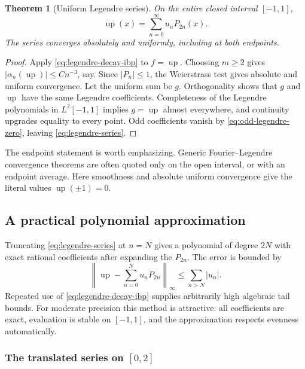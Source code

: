 \documentclass[11pt,oneside]{article}
\newtheorem{theorem}{Theorem}[section]
\theoremstyle{definition}
\theoremstyle{remark}
\newcommand{\Up}{\operatorname{up}}
\begin{document}
\begin{theorem}[Uniform Legendre series]
On the entire closed interval $[-1,1]$,
\begin{equation}
 \boxed{
 \Up(x)=\sum_{n=0}^{\infty}u_nP_{2n}(x).}                 \label{eq:legendre-series}
\end{equation}
The series converges absolutely and uniformly, including at both endpoints.
\end{theorem}

\begin{proof}
Apply \eqref{eq:legendre-decay-ibp} to $f=\Up$.  Choosing $m\ge2$ gives
$|\alpha_n(\Up)|\le Cn^{-3}$, say.  Since $|P_n|\le1$, the Weierstrass test gives absolute
and uniform convergence.  Let the uniform sum be $g$.  Orthogonality shows that $g$ and
$\Up$ have the same Legendre coefficients.  Completeness of the Legendre polynomials in
$L^2[-1,1]$ implies $g=\Up$ almost everywhere, and continuity upgrades equality to every
point.  Odd coefficients vanish by \eqref{eq:odd-legendre-zero}, leaving
\eqref{eq:legendre-series}.
\end{proof}

The endpoint statement is worth emphasizing.  Generic Fourier--Legendre convergence theorems
are often quoted only on the open interval, or with an endpoint average.  Here smoothness and
absolute uniform convergence give the literal values $\Up(\pm1)=0$.

\subsection{A practical polynomial approximation}

Truncating \eqref{eq:legendre-series} at $n=N$ gives a polynomial of degree $2N$ with exact
rational coefficients after expanding the $P_{2n}$.  The error is bounded by
\begin{equation}
 \left\|\Up-\sum_{n=0}^{N}u_nP_{2n}\right\|_\infty
 \le\sum_{n>N}|u_n|.                                      \label{eq:legendre-tail-bound}
\end{equation}
Repeated use of \eqref{eq:legendre-decay-ibp} supplies arbitrarily high algebraic tail bounds.
For moderate precision this method is attractive: all coefficients are exact, evaluation is
stable on $[-1,1]$, and the approximation respects evenness automatically.



\subsubsection{The translated series on $[0,2]$}
\end{document}
